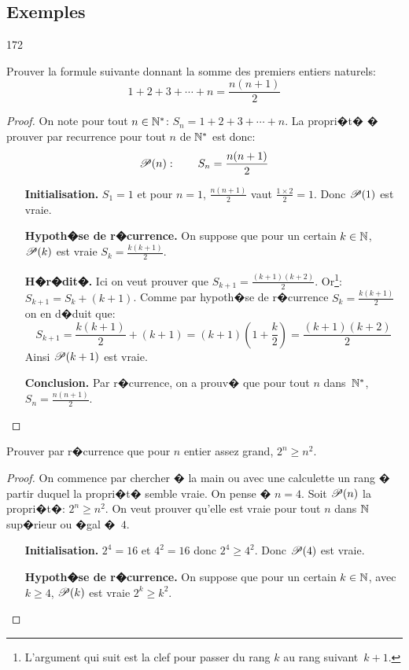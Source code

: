 \subsection{Exemples}
\begin{dingautolist}{172}
\item
Prouver la formule suivante donnant la somme des premiers entiers naturels:
\[ 1+2+3+\cdots+n=\frac{n(n+1)}{2}\]
\begin{proof}

On note pour tout $n\in\mathbb{N}^*$: $S_n=1+2+3+\cdots+n$. La propri�t� � prouver par recurrence pour tout $n$ de $\mathbb{N}^*$ est donc:
\[ \mathscr{P} (n): \qquad S_n=\frac{n(n+1)}{2}\]
\begin{itemize}
\item[\bf Initialisation.] $S_1=1$ et pour $n=1$, $\frac{n(n+1)}{2}$ vaut $\frac{1\times 2}{2}=1$. Donc $\mathscr{P} (1)$ est vraie.
\item[\bf Hypoth�se de r�currence.] On suppose que pour un certain $k\in\mathbb{N}$, $\mathscr{P} (k)$ est vraie \ie{}  $S_k=\frac{k(k+1)}{2}$.
\item[\bf H�r�dit�.] Ici on veut prouver que $S_{k+1}= \frac{(k+1)(k+2)}{2}$. Or\footnote{L'argument qui suit est la clef pour passer du rang $k$ au rang suivant~$k+1$.}: $S_{k+1}=S_k+(k+1)$. Comme par hypoth�se de r�currence $S_k=\frac{k(k+1)}{2}$ on en d�duit que:
\[S_{k+1}=\frac{k(k+1)}{2}+(k+1)=(k+1)(1+\frac{k}{2})=\frac{(k+1)(k+2)}{2}\]
Ainsi $\mathscr{P} (k+1)$ est vraie.
\item[\bf Conclusion.] Par r�currence, on a prouv� que  pour tout $n$ dans~$\mathbb{N}^*$,  $S_n=\frac{n(n+1)}{2}$.

\end{itemize}
\end{proof}

\item Prouver par r�currence que pour $n$ entier assez grand, $2^n \geq  n^2$.
\begin{proof} On commence par chercher � la main ou avec une calculette un rang � partir duquel la propri�t� semble vraie. On pense � $n=4$. Soit $\mathscr{P} (n)$ la propri�t�: $2^n \geq  n^2$. On veut prouver qu'elle est vraie pour tout $n$ dans $\mathbb{N}$ sup�rieur ou �gal �~$4$.
\begin{itemize}
\item[\bf Initialisation.] $2^4=16$ et $4^2=16$ donc $2^4 \geq  4^2$. Donc $\mathscr{P} (4)$ est vraie.
\item[\bf Hypoth�se de r�currence.] On suppose que pour un certain
  $k\in\mathbb{N}$, avec  $k\geq 4$, $\mathscr{P} (k)$ est vraie \ie{} $2^k \geq  k^2$.


\end{itemize}
\end{proof}
\end{dingautolist}
